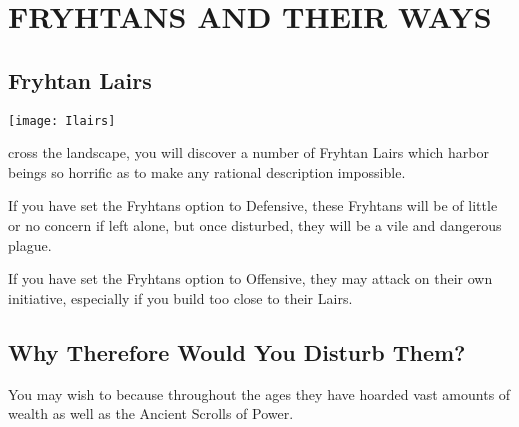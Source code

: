 
\chapter{\textsf{FRYHTANS AND THEIR WAYS}}

\section{\textsf{Fryhtan Lairs}}


\begin{center}
    \texttt{[image: Ilairs]} %
\end{center}

cross the landscape, you will discover a number of Fryhtan Lairs which harbor beings so horrific as to make any rational description impossible.

If you have set the Fryhtans option to Defensive, these Fryhtans will be of little or no concern if left alone, but once disturbed, they will be a vile and dangerous plague.

If you have set the Fryhtans option to Offensive, they may attack on their own initiative, especially if you build too close to their Lairs.

\section{\textsf{Why Therefore Would You Disturb Them?}}


You may wish to because throughout the ages they have hoarded vast amounts of wealth as well as the Ancient Scrolls of Power.

